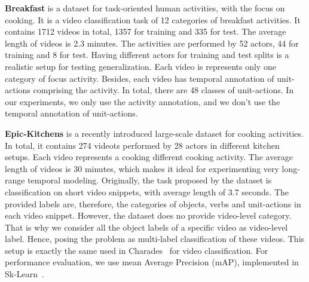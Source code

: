 \documentclass[10pt,twocolumn,letterpaper]{article}
\newcommand{\partitle}[1]{\noindent\textbf{#1}}
\newcommand{\ptspace}{\vspace*{5pt}}
\begin{document}
\ptspace
\partitle{Breakfast}
is a dataset for task-oriented human activities, with the focus on cooking.
It is a video classification task of 12 categories of breakfast activities.
It contains 1712 videos in total, 1357 for training and 335 for test.
The average length of videos is 2.3 minutes.
The activities are performed by 52 actors, 44 for training and 8 for test.
Having different actors for training and test splits is a realistic setup for testing generalization.
Each video is represents only one category of focus activity.
Besides, each video has temporal annotation of unit-actions comprising the activity.
In total, there are 48 classes of unit-actions.
In our experiments, we only use the activity annotation, and we don't use the temporal annotation of unit-actions.

\ptspace
\partitle{Epic-Kitchens}
is a recently introduced large-scale dataset for cooking activities.
In total, it contains 274 videots performed by 28 actors in different kitchen setups.
Each video represents a cooking different cooking activity.
The average length of videos is 30 minutes, which makes it ideal for experimenting very long-range temporal modeling.
Originally, the task proposed by the dataset is classification on short video snippets, with average length of 3.7 seconds.
The provided labels are, therefore, the categories of objects, verbs and unit-actions in each video snippet.
However, the dataset does no provide video-level category.
That is why we consider all the object labels of a specific video as video-level label.
Hence, posing the problem as multi-label classification of these videos.
This setup is exactly the same used in Charades~\cite{sigurdsson2016hollywood} for video classification.
For performance evaluation, we use mean Average Precision (mAP), implemented in Sk-Learn~\cite{scikit-learn}.
\end{document}
